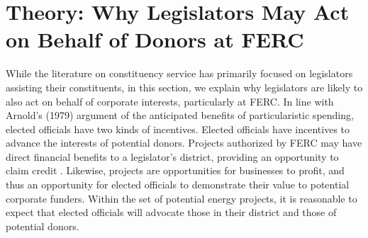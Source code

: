 \documentclass{article}
\begin{document}



\section{Theory: Why Legislators May Act on Behalf of Donors at FERC}

While the literature on constituency service has primarily focused on legislators assisting their constituents, in this section, we explain why legislators are likely to also act on behalf of corporate interests, particularly at FERC.  In line with Arnold's (1979) argument of the anticipated benefits of particularistic spending, elected officials have two kinds of incentives.  Elected officials have incentives to advance the interests of potential donors. Projects authorized by FERC may have direct financial benefits to a legislator's district, providing an opportunity to claim credit \citep{Arnold1979, GriWesMes14}. Likewise, projects are opportunities for businesses to profit, and thus an opportunity for elected officials to demonstrate their value to potential corporate funders. Within the set of potential energy projects, it is reasonable to expect that elected officials will advocate those in their district and those of potential donors.
\end{document}
